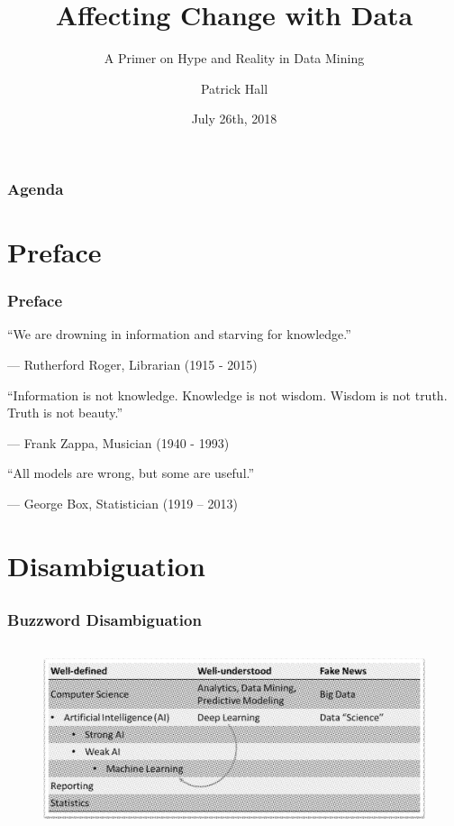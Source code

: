 \documentclass[11pt,
               aspectratio=169
               ]{beamer}
\author{Patrick Hall}
\title{Affecting Change with Data}
\subtitle{A Primer on Hype and Reality in Data Mining}
\institute{\href{https://www.h2o.ai}{H\textsubscript{2}O.ai}}
\date{July 26th, 2018}
\begin{document}
	
	\maketitle
	
	\begin{frame}
	
		\frametitle{Agenda}
	
		\tableofcontents{}
	
	\end{frame}

	\section*{Preface}

		\begin{frame}

			\frametitle{Preface}

			\epigraph{“We are drowning in information and starving for knowledge.”}{--- \textup{Rutherford Roger}, Librarian (1915 - 2015)}

			\epigraph{“Information is not knowledge. Knowledge is not wisdom. Wisdom is not truth. Truth is not beauty.”}{--- \textup{Frank Zappa}, Musician (1940 - 1993)}

			\epigraph{“All models are wrong, but some are useful.”}{--- \textup{George Box}, Statistician (1919 – 2013)}

		\end{frame}

	\section{Disambiguation}
	
		\subsection*{}
		
		\begin{frame}[t]
		
			\frametitle{Buzzword Disambiguation}
			
			\begin{figure}[htb]
				\begin{center}
					\includegraphics[height=155pt, angle=1]{img/buzzwords.png}
					\label{fig:buzzwords}
				\end{center}
			\end{figure}
		
		\end{frame}
\end{document}
